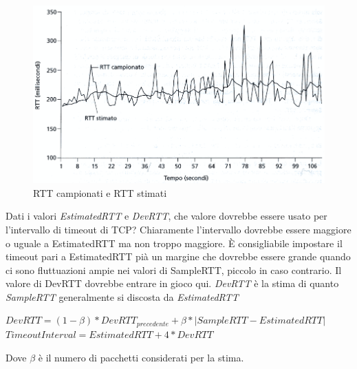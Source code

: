 \documentclass[11pt,a4paper]{article}
\begin{document}
\begin{figure}
	\includegraphics[scale=0.6]{img/032.png}
	\caption{RTT campionati e RTT stimati}
\end{figure}
Dati i valori \emph{EstimatedRTT} e \emph{DevRTT}, che valore dovrebbe essere usato per l'intervallo di timeout di TCP? Chiaramente l'intervallo dovrebbe essere maggiore o uguale a EstimatedRTT ma non troppo maggiore. È consigliabile impostare il timeout pari a EstimatedRTT pià un margine che dovrebbe essere grande quando ci sono fluttuazioni ampie nei valori di SampleRTT, piccolo in caso contrario. Il valore di DevRTT dovrebbe entrare in gioco qui. \emph{DevRTT} è la stima di quanto \emph{SampleRTT} generalmente si discosta da \emph{EstimatedRTT}
\begin{center}
	$DevRTT = (1 - \beta)*DevRTT_{precedente} + \beta*|SampleRTT - EstimatedRTT|$
	\textbf{$TimeoutInterval = EstimatedRTT + 4 * DevRTT$}
\end{center}
Dove $\beta$ è il numero di pacchetti considerati per la stima.
\end{document}

